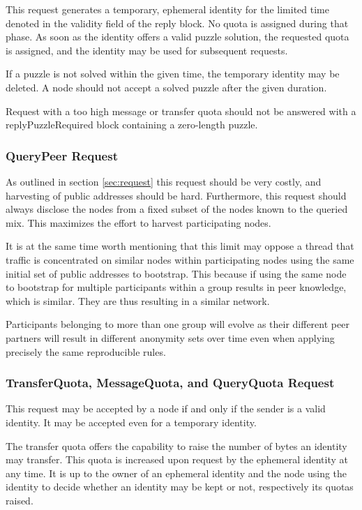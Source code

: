 This request generates a temporary, ephemeral identity for the limited time denoted in the validity field of the reply block. No quota is assigned during that phase. As soon as the identity offers a valid puzzle solution, the requested quota is assigned, and the identity may be used for subsequent requests.

If a puzzle is not solved within the given time, the temporary identity may be deleted. A node should not accept a solved puzzle after the given duration. 

Request with a too high message or transfer quota should not be answered with a replyPuzzleRequired block containing a zero-length puzzle.

\subsubsection{QueryPeer Request}
As outlined in section \ref{sec:request} this request should be very costly, and harvesting of public addresses should be hard. Furthermore, this request should always disclose the nodes from a fixed subset of the nodes known to the queried mix. This maximizes the effort to harvest participating nodes.

It is at the same time worth mentioning that this limit may oppose a thread that traffic is concentrated on similar nodes within participating nodes using the same initial set of public addresses to bootstrap. This because if using the same node to bootstrap for multiple participants within a group results in peer knowledge, which is similar. They are thus resulting in a similar network. 

Participants belonging to more than one group will evolve as their different peer partners will result in different anonymity sets over time even when applying precisely the same reproducible rules.

\subsubsection{TransferQuota, MessageQuota,  and QueryQuota Request}
This request may be accepted by a node if and only if the sender is a valid identity. It may be accepted even for a temporary identity.

The transfer quota offers the capability to raise the number of bytes an identity may transfer. This quota is increased upon request by the ephemeral identity at any time. It is up to the owner of an ephemeral identity and the node using the identity to decide whether an identity may be kept or not, respectively its quotas raised.

